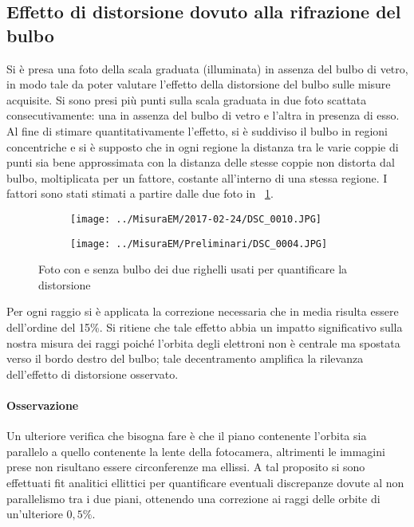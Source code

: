 \documentclass[10pt,a4paper]{article}
\begin{document}
\subsection{Effetto di distorsione dovuto alla rifrazione del bulbo}
Si è presa una foto della scala graduata (illuminata) in assenza del bulbo di vetro, in modo tale da poter valutare l'effetto della distorsione del bulbo sulle misure acquisite. Si sono presi più punti sulla scala graduata in due foto scattata consecutivamente: una in assenza del bulbo di vetro e l'altra in presenza di esso.
Al fine di stimare quantitativamente l'effetto, si è suddiviso il bulbo in regioni concentriche e si è supposto che in ogni regione la distanza tra le varie coppie di punti sia bene approssimata con la distanza delle stesse coppie non distorta dal bulbo, moltiplicata per un fattore, costante all'interno di una stessa regione. I fattori sono stati stimati a partire dalle due foto in \figurename{~\ref{fig:righelli}}.

\begin{figure}[H]
	\begin{minipage}{0.49\textwidth}
		\begin{figure}[H]
			\centering
			\texttt{[image: ../MisuraEM/2017-02-24/DSC\_0010.JPG]}
		\end{figure}
	\end{minipage}
	\begin{minipage}{0.49\textwidth}
		\begin{figure}[H]
			\centering
			\texttt{[image: ../MisuraEM/Preliminari/DSC\_0004.JPG]}
		\end{figure}
	\end{minipage}
\caption{Foto con e senza bulbo dei due righelli usati per quantificare la distorsione}
\label{fig:righelli}
\end{figure}



Per ogni raggio si è applicata la correzione necessaria che in media risulta essere dell'ordine del 15\%.
Si ritiene che tale effetto abbia un impatto significativo sulla nostra misura dei raggi poiché l'orbita degli elettroni non è centrale ma spostata verso il bordo destro del bulbo; tale decentramento amplifica la rilevanza dell'effetto di distorsione osservato.

\paragraph{Osservazione}
Un ulteriore verifica che bisogna fare è che il piano contenente l'orbita sia parallelo a quello contenente la lente della fotocamera, altrimenti le immagini prese non risultano essere circonferenze ma ellissi. A tal proposito si sono effettuati fit analitici ellittici per quantificare eventuali discrepanze dovute al non parallelismo tra i due piani, ottenendo una correzione ai raggi delle orbite di un'ulteriore $0,5\%$.
\end{document}
